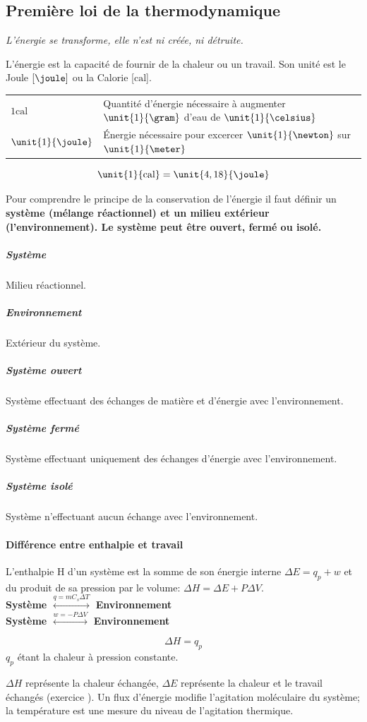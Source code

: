 \documentclass[11pt,a4paper,french]{article}
\renewcommand{\textbf}[1]{\begingroup\bfseries\mathversion{bold}#1\endgroup}
\newcommand\calo{\mathrm{cal}}
\begin{document}
\subsection{Première loi de la thermodynamique}
\emph{L'énergie se transforme, elle n'est ni créée, ni détruite.}

L'énergie est la capacité de fournir de la chaleur ou un travail.
Son unité est le Joule $[\joule]$ ou la Calorie [$\calo$].
\begin{center}
	\begin{tabular}{ll}
		$\unit{1}{\calo}$ & Quantité  d'énergie nécessaire à augmenter $\unit{1}{\gram}$ d'eau de $\unit{1}{\celsius}$\\
		$\unit{1}{\joule}$ & \'Energie nécessaire pour excercer $\unit{1}{\newton}$ sur $\unit{1}{\meter}$
	\end{tabular}
\end{center}
\[ \unit{1}{\calo} = \unit{4,18}{\joule} \]

Pour comprendre le principe de la conservation de l'énergie il faut définir un \textbf{système} (mélange réactionnel) et un milieu extérieur (l'environnement).
Le système peut être ouvert, fermé ou isolé.

\subparagraph{Système} Milieu réactionnel.
\subparagraph{Environnement} Extérieur du système.
\subparagraph{Système ouvert} Système effectuant des échanges de matière et d'énergie avec l'environnement.
\subparagraph{Système fermé} Système effectuant uniquement des échanges d'énergie avec l'environnement.
\subparagraph{Système isolé} Système n'effectuant aucun échange avec l'environnement.

\paragraph{Différence entre enthalpie et travail} L'enthalpie H d'un système est la somme de son énergie interne $\Delta E=q_p+w$ et du produit de sa pression par le volume: $\Delta H=\Delta E+P\Delta V$.\\

\textbf{Système} $\stackrel{q=mC_s\Delta T}{\longleftrightarrow}$ \textbf{Environnement}\\

\textbf{Système} $\stackrel{w=-P\Delta V}{\longleftrightarrow}$ \textbf{Environnement}

$$\Delta H=q_p$$ $q_p$ étant la chaleur à pression constante.

$\Delta H$ représente la chaleur échangée, $\Delta E$ représente la chaleur et le travail échangés (exercice \cite[p.~10]{legras}).
Un flux d'énergie modifie l'agitation moléculaire du système; la température est une mesure du niveau de l'agitation thermique.
\end{document}
